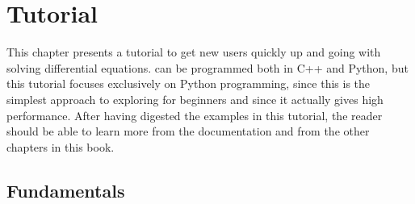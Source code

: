 

\newcommand{\langtangenxpoint}{{x}}
\newcommand{\langtangennormalvec}{{n}}
\newcommand{\langtangenep}{\thinspace . }
\newcommand{\para}[1]{\paragraph{#1}}
\newcommand{\langtangencodett}[1]{{\rm\texttt{#1}}}
\newcommand{\langtangenidx}[1]{\index{#1@\langtangencodett{#1}}}

\newcommand{\Vg}{V^{(\mbox{g})}}
\newcommand{\ue}{u_{\mbox{e}}}
\newcommand{\gln}{\vspace{2mm}\par}

\chapter{Tutorial}
\label{langtangen:main}


\newcommand{\hpl}[1]{}


This chapter presents a \fenics{} tutorial to get new users quickly up
and going with solving differential equations. \fenics{} can be
programmed both in C++ and Python, but this tutorial focuses
exclusively on Python programming, since this is the simplest approach
to exploring \fenics{} for beginners and since it actually gives
high performance. After having digested the examples in this tutorial,
the reader should be able to learn more from the \fenics{}
documentation and from the other chapters in this book.


\section{Fundamentals}
\label{langtangen:fundamentals}

